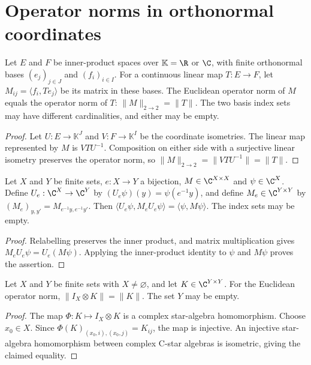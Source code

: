 \section{Operator norms in orthonormal coordinates}

\begin{theorem}
    \label{thm:operator_norm_orthonormal_coordinates}
    \leanok
    Let $E$ and $F$ be inner-product spaces over $\mathbb K=\R$ or $\C$,
    with finite orthonormal bases $(e_j)_{j\in J}$ and $(f_i)_{i\in I}$.
    For a continuous linear map $T:E\to F$, let
    $M_{ij}=\langle f_i,Te_j\rangle$ be its matrix in these bases.
    The Euclidean operator norm of $M$ equals the operator norm of $T$:
    $\|M\|_{2\to2}=\|T\|$.
    The two basis index sets may have different cardinalities, and either
    may be empty.
\end{theorem}

\begin{proof}\leanok
    Let $U:E\to\mathbb K^J$ and $V:F\to\mathbb K^I$ be the coordinate
    isometries. The linear map represented by $M$ is $VTU^{-1}$.
    Composition on either side with a surjective linear isometry preserves
    the operator norm, so $\|M\|_{2\to2}=\|VTU^{-1}\|=\|T\|$.
\end{proof}

\begin{theorem}
    \label{thm:expectation_coordinate_change}
    \leanok
    Let $X$ and $Y$ be finite sets, $e:X\to Y$ a bijection,
    $M\in\C^{X\times X}$ and $\psi\in\C^X$.
    Define $U_e:\C^X\to\C^Y$ by $(U_e\psi)(y)=\psi(e^{-1}y)$, and define
    $M_e\in\C^{Y\times Y}$ by
    $(M_e)_{y,y'}=M_{e^{-1}y,e^{-1}y'}$.
    Then $\langle U_e\psi,M_eU_e\psi\rangle=\langle\psi,M\psi\rangle$.
    The index sets may be empty.
\end{theorem}

\begin{proof}\leanok
    Relabelling preserves the inner product, and matrix multiplication
    gives $M_eU_e\psi=U_e(M\psi)$. Applying the inner-product identity to
    $\psi$ and $M\psi$ proves the assertion.
\end{proof}

\begin{theorem}
    \label{thm:operator_norm_identity_factor}
    \leanok
    Let $X$ and $Y$ be finite sets with $X\ne\varnothing$, and let
    $K\in\C^{Y\times Y}$.
    For the Euclidean operator norm,
    $\lVert I_X\otimes K\rVert=\lVert K\rVert$.
    The set $Y$ may be empty.
\end{theorem}

\begin{proof}\leanok
    The map $\Phi:K\mapsto I_X\otimes K$ is a complex star-algebra
    homomorphism. Choose $x_0\in X$.
    Since $\Phi(K)_{(x_0,i),(x_0,j)}=K_{ij}$, the map is injective.
    An injective star-algebra homomorphism between complex C-star algebras
    is isometric, giving the claimed equality.
\end{proof}
